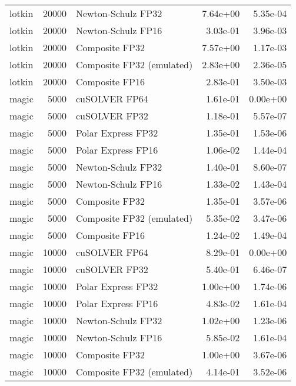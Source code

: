 \begin{table}
\begin{tabular}{lrlrr}
   lotkin & 20000 &        Newton-Schulz FP32 &  7.64e+00 &        5.35e-04 \\
   lotkin & 20000 &        Newton-Schulz FP16 &  3.03e-01 &        3.96e-03 \\
   lotkin & 20000 &            Composite FP32 &  7.57e+00 &        1.17e-03 \\
   lotkin & 20000 & Composite FP32 (emulated) &  2.83e+00 &        2.36e-05 \\
   lotkin & 20000 &            Composite FP16 &  2.83e-01 &        3.50e-03 \\
    magic &  5000 &             cuSOLVER FP64 &  1.61e-01 &        0.00e+00 \\
    magic &  5000 &             cuSOLVER FP32 &  1.18e-01 &        5.57e-07 \\
    magic &  5000 &        Polar Express FP32 &  1.35e-01 &        1.53e-06 \\
    magic &  5000 &        Polar Express FP16 &  1.06e-02 &        1.44e-04 \\
    magic &  5000 &        Newton-Schulz FP32 &  1.40e-01 &        8.60e-07 \\
    magic &  5000 &        Newton-Schulz FP16 &  1.33e-02 &        1.43e-04 \\
    magic &  5000 &            Composite FP32 &  1.35e-01 &        3.57e-06 \\
    magic &  5000 & Composite FP32 (emulated) &  5.35e-02 &        3.47e-06 \\
    magic &  5000 &            Composite FP16 &  1.24e-02 &        1.49e-04 \\
    magic & 10000 &             cuSOLVER FP64 &  8.29e-01 &        0.00e+00 \\
    magic & 10000 &             cuSOLVER FP32 &  5.40e-01 &        6.46e-07 \\
    magic & 10000 &        Polar Express FP32 &  1.00e+00 &        1.74e-06 \\
    magic & 10000 &        Polar Express FP16 &  4.83e-02 &        1.61e-04 \\
    magic & 10000 &        Newton-Schulz FP32 &  1.02e+00 &        1.23e-06 \\
    magic & 10000 &        Newton-Schulz FP16 &  5.85e-02 &        1.61e-04 \\
    magic & 10000 &            Composite FP32 &  1.00e+00 &        3.67e-06 \\
    magic & 10000 & Composite FP32 (emulated) &  4.14e-01 &        3.52e-06 \\

\end{tabular}
\end{table}
